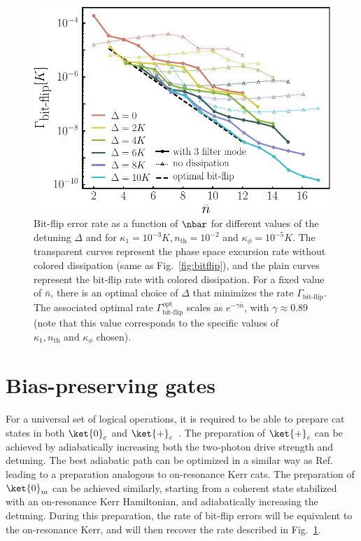 \begin{figure}[t!]
    \includegraphics[width=\columnwidth]{file/image/Color_Bitflip_V2.pdf}
    \vspace{-0.5cm}
    \caption{\label{fig:coloredbitflip} 
    Bit-flip error rate as a function of $\nbar$ for different values of the detuning $\Delta$ and for $\kappa_1 = 10^{-3}K, n_{\text{th}}=10^{-2}$ and $\kappa_\phi = 10^{-5}K$. The transparent curves represent the phase space excursion rate without colored dissipation (same as Fig.~\ref{fig:bitflip}), and the plain curves represent the bit-flip rate with colored dissipation. For a fixed value of $\bar n$, there is an optimal choice of $\Delta$ that minimizes the rate $\Gamma_\text{bit-flip}$. The associated optimal rate $\Gamma^{\text{opt}}_\text{bit-flip}$ scales as $e^{-\gamma\bar n}$, with $\gamma\approx 0.89$ (note that this value corresponds to the specific values of $\kappa_1,n_{\text{th}} \text{ and } \kappa_\phi$ chosen).
    }
\end{figure}

\section{\label{sec:level6}Bias-preserving gates}

For a universal set of logical operations, it is required to be able to prepare cat states in both $\ket{0}_c$ and $\ket{+}_c$~\cite{Guillaud2019}. The preparation of $\ket{+}_c$ can be achieved by adiabatically increasing both the two-photon drive strength and detuning. The best adiabatic path can be optimized in a similar way as Ref.~\cite{Yanagimoto2019} leading to a preparation analogous to on-resonance Kerr cats. The preparation of $\ket{0}_m$ can be achieved similarly, starting from a coherent state stabilized with an on-resonance Kerr Hamiltonian, and adiabatically increasing the detuning. During this preparation, the rate of bit-flip errors will be equivalent to the on-resonance Kerr, and will then recover the rate described in Fig.~\ref{fig:coloredbitflip}.

